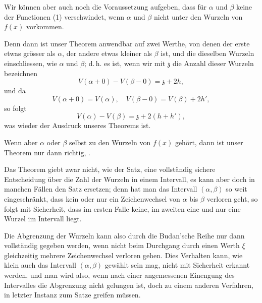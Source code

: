 
Wir können aber auch noch die Voraussetzung aufgeben, dass für $\alpha$ und
$\beta$ keine der Functionen (1) verschwindet, wenn $\alpha$ und $\beta$
nicht unter den Wurzeln von $f(x)$ vorkommen.

Denn dann ist unser Theorem anwendbar auf zwei Werthe, von denen der erste
etwas grösser als $\alpha$, der andere etwas kleiner als $\beta$ ist, und
die dieselben Wurzeln einschliessen, wie $\alpha$ und $\beta$; d.\,h. es
ist, wenn wir mit $\mathfrak{z}$ die Anzahl dieser Wurzeln bezeichnen
\[
V(\alpha + 0) - V(\beta - 0) = \mathfrak{z} + 2h,
\]
und da
\[
V(\alpha + 0) = V(\alpha), \quad V(\beta - 0) = V(\beta) + 2h',
\]
so folgt
\[
V(\alpha) - V(\beta) = \mathfrak{z} + 2(h + h'),
\]
was wieder der Ausdruck unseres Theorems ist.

Wenn aber $\alpha$ oder $\beta$ selbst zu den Wurzeln von $f(x)$ gehört,
dann ist unser Theorem nur dann richtig, .

Das  Theorem giebt zwar nicht, wie der
 Satz, eine vollständig sichere Entscheidung über die
Zahl der Wurzeln in einem Intervall, es kann aber doch in manchen Fällen
den  Satz ersetzen; denn hat man das Intervall
$(\alpha, \beta)$ so weit eingeschränkt, dass kein oder nur ein
Zeichenwechsel von $\alpha$ bis $\beta$ verloren geht, so folgt mit
Sicherheit, dass im ersten Falle keine, im zweiten eine und nur eine
Wurzel im Intervall liegt.

Die Abgrenzung der Wurzeln kann also durch die Budan'sche Reihe nur dann
vollständig gegeben werden, wenn nicht beim Durchgang durch einen Werth
$\xi$ gleichzeitig mehrere Zeichenwechsel verloren gehen. Dies Verhalten
kann, wie klein auch das Intervall $(\alpha, \beta)$ gewählt sein mag,
nicht mit Sicherheit erkannt werden, und man wird also, wenn nach einer
angemessenen Einengung des Intervalles die Abgrenzung nicht gelungen ist,
doch zu einem anderen Verfahren, in letzter Instanz zum
 Satze greifen müssen.
